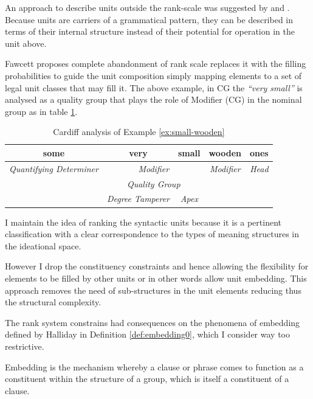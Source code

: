 %
An approach to describe units outside the rank-scale was suggested by \cite{Fawcett2000} and \cite{Butler1985}. Because units are carriers of a grammatical pattern, they can be described in terms of their internal structure instead of their potential for operation in the unit above.

Fawcett proposes complete abandonment of rank scale replaces it with the filling probabilities to guide the unit composition simply mapping elements to a set of legal unit classes that may fill it. The above example, in CG the \textit{``very small''} is analysed as a quality group that plays the role of Modifier (CG) in the nominal group as in table \ref{tab:example-substructure-analisys-cardiff}.

\begin{table}[H]
	\centering
	\begin{tabular}{|c|c|c|c|c|}
		\hline
		\textbf{some} & \textbf{very} & \textbf{small} & \textbf{wooden} & \textbf{ones} \\ \hline
		\textit{Quantifying Determiner} & \multicolumn{2}{c|}{\textit{Modifier}} & \textit{Modifier} & \textit{Head} \\ \hline
		\multirow{2}{*}{\textit{}} & \multicolumn{2}{c|}{\textit{Quality Group}} & \multicolumn{2}{c|}{\multirow{2}{*}{\textit{}}} \\ \cline{2-3}
		& \textit{Degree Tamperer} & \textit{Apex} & \multicolumn{2}{c|}{} \\ \hline
	\end{tabular}
	\caption{Cardiff analysis of Example \ref{ex:small-wooden}}
	\label{tab:example-substructure-analisys-cardiff}
\end{table}

I maintain the idea of ranking the syntactic units because it is a pertinent classification with a clear correspondence to the types of meaning structures in the ideational space.

However I drop the constituency constraints and hence allowing the flexibility for elements to be filled by other units or in other words allow unit embedding. This approach removes the need of sub-structures in the unit elements reducing thus the structural complexity.

The rank system constrains had consequences on the phenomena of embedding defined by Halliday in Definition \ref{def:embedding0}, which I consider way too restrictive.

\begin{definition}\label{def:embedding0}
	Embedding is the mechanism whereby a clause or phrase comes to function as a constituent within the structure of a group, which is itself a constituent of a clause. \citep[p.242]{Halliday2013}
\end{definition}

